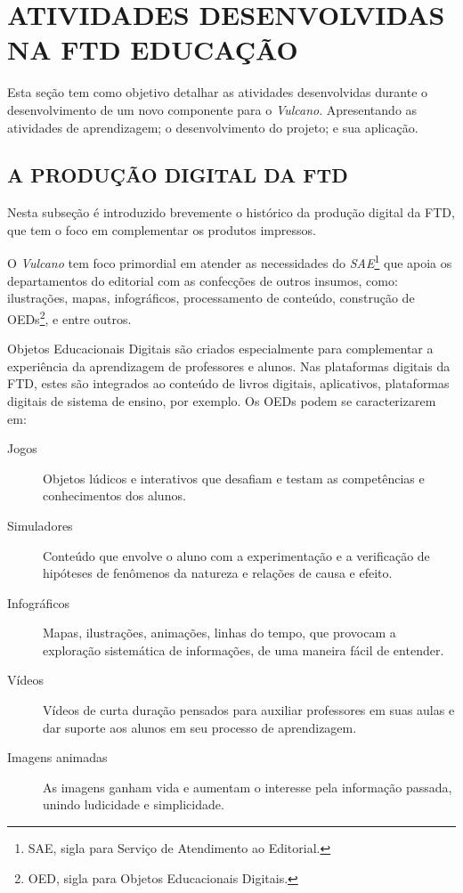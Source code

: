 \documentclass[
  12pt,				%
  openany,
  oneside,
  a4paper,			%
  english,			%
  brazil
]{article}
\numberwithin{figure}{section}
\numberwithin{table}{section}
\begin{document}
\clearpage
\section{ATIVIDADES DESENVOLVIDAS NA FTD EDUCAÇÃO}

Esta seção tem como objetivo detalhar as atividades desenvolvidas durante o desenvolvimento de um novo componente para o \textit{Vulcano}. Apresentando as atividades de aprendizagem; o desenvolvimento do projeto; e sua aplicação.

\subsection{A PRODUÇÃO DIGITAL DA FTD}

Nesta subseção é introduzido brevemente o histórico da produção digital da FTD, que tem o foco em complementar os produtos impressos.

O \textit{Vulcano} tem foco primordial em atender as necessidades do \textit{SAE}\footnote{SAE, sigla para Serviço de Atendimento ao Editorial.} que apoia os departamentos do editorial com as confecções de outros insumos, como: ilustrações, mapas, infográficos, processamento de conteúdo, construção de OEDs\footnote{OED, sigla para Objetos Educacionais Digitais.}, e entre outros.

Objetos Educacionais Digitais são criados especialmente para complementar a experiência da aprendizagem de professores e alunos. Nas plataformas digitais da FTD, estes são integrados ao conteúdo de livros digitais, aplicativos, plataformas digitais de sistema de ensino, por exemplo. Os OEDs podem se caracterizarem em:

\begin{description}
	\item[Jogos] Objetos lúdicos e interativos que desafiam e testam as competências e conhecimentos dos alunos.
	\item[Simuladores] Conteúdo que envolve o aluno com a experimentação e a verificação de hipóteses de fenômenos da natureza e relações de causa e efeito.
	\item[Infográficos] Mapas, ilustrações, animações, linhas do tempo, que provocam a exploração sistemática de informações, de uma maneira fácil de entender.
	\item[Vídeos] Vídeos de curta duração pensados para auxiliar professores em suas aulas e dar suporte aos alunos em seu processo de aprendizagem.
	\item[Imagens animadas] As imagens ganham vida e aumentam o interesse pela informação passada, unindo ludicidade e simplicidade.
\end{description}
\end{document}
